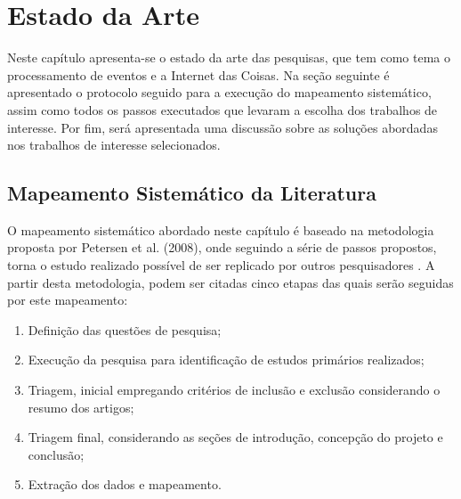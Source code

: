 \documentclass[ti,table]{texufpel} %
\begin{document}
  

  

  


  

\chapter{Estado da Arte}  

\label{cap:Estado_da_Arte} 

  

Neste capítulo apresenta-se o estado da arte das pesquisas, que tem como tema o processamento de eventos e a Internet das Coisas. Na seção seguinte é apresentado o protocolo seguido para a execução do mapeamento sistemático, assim como todos os passos executados que levaram a escolha dos trabalhos de interesse. Por fim, será apresentada uma discussão sobre as soluções abordadas nos trabalhos de interesse selecionados.     

  

\section{Mapeamento Sistemático da Literatura} 

  

O mapeamento sistemático abordado neste capítulo é baseado na metodologia proposta por Petersen et al. (2008), onde seguindo a série de passos propostos, torna o estudo realizado possível de ser replicado por outros pesquisadores \cite{petersen08}. A partir desta metodologia, podem ser citadas cinco etapas das quais serão seguidas por este mapeamento: 

  

\begin{enumerate} 

    \item Definição das questões de pesquisa; 

    \item Execução da pesquisa para identificação de estudos primários realizados; 

    \item Triagem, inicial empregando critérios de inclusão e exclusão considerando o resumo dos artigos; 

    \item Triagem final, considerando as seções de introdução, concepção do projeto e conclusão; 

    \item Extração dos dados e mapeamento. 

     

  

\end{enumerate}   
\end{document}
